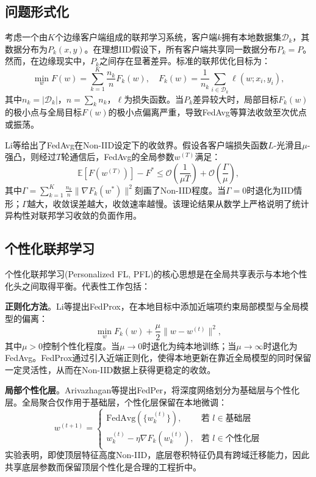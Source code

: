 \documentclass[a4paper,12pt]{article}
\begin{document}
\subsection{问题形式化}

考虑一个由$K$个边缘客户端组成的联邦学习系统，客户端$k$拥有本地数据集$\mathcal{D}_k$，其数据分布为$P_k(x,y)$。在理想IID假设下，所有客户端共享同一数据分布$P_k = P$。然而，在边缘现实中，$P_k$之间存在显著差异。标准的联邦优化目标为：
\begin{equation}
\min_{w} F(w) = \sum_{k=1}^{K} \frac{n_k}{n} F_k(w), \quad F_k(w) = \frac{1}{n_k}\sum_{i \in \mathcal{D}_k} \ell(w; x_i, y_i),
\label{eq:global_obj}
\end{equation}
其中$n_k = |\mathcal{D}_k|$，$n = \sum_k n_k$，$\ell$为损失函数。当$P_k$差异较大时，局部目标$F_k(w)$的极小点与全局目标$F(w)$的极小点偏离严重，导致FedAvg等算法收敛至次优点或振荡\cite{li2020convergence}。

Li等\cite{li2020convergence}给出了FedAvg在Non-IID设定下的收敛界。假设各客户端损失函数$L$-光滑且$\mu$-强凸，则经过$T$轮通信后，FedAvg的全局参数$w^{(T)}$满足：
\begin{equation}
\mathbb{E}[F(w^{(T)})] - F^* \leq \mathcal{O}\left(\frac{1}{\mu T}\right) + \mathcal{O}\left(\frac{\Gamma}{\mu}\right),
\end{equation}
其中$\Gamma = \sum_{k=1}^{K} \frac{n_k}{n}\|\nabla F_k(w^*)\|^2$刻画了Non-IID程度。当$\Gamma = 0$时退化为IID情形；$\Gamma$越大，收敛误差越大，收敛速率越慢。该理论结果从数学上严格说明了统计异构性对联邦学习收敛的负面作用。

\subsection{个性化联邦学习}

个性化联邦学习(Personalized FL, PFL)的核心思想是在全局共享表示与本地个性化头之间取得平衡。代表性工作包括：

\textbf{正则化方法}。Li等\cite{li2020federated}提出FedProx，在本地目标中添加近端项约束局部模型与全局模型的偏离：
\begin{equation}
\min_{w} F_k(w) + \frac{\mu}{2}\|w - w^{(t)}\|^2,
\label{eq:fedprox}
\end{equation}
其中$\mu > 0$控制个性化程度。当$\mu \to 0$时退化为纯本地训练；当$\mu \to \infty$时退化为FedAvg。FedProx通过引入近端正则化，使得本地更新在靠近全局模型的同时保留一定灵活性，从而在Non-IID数据上获得更稳定的收敛。

\textbf{局部个性化层}。Arivazhagan等\cite{arivazhagan2019federated}提出FedPer，将深度网络划分为基础层与个性化层。全局聚合仅作用于基础层，个性化层保留在本地微调：
\begin{equation}
w^{(t+1)} = \begin{cases}
\text{FedAvg}(\{w_k^{(t)}\}), & \text{若 } l \in \text{基础层} \\
w_k^{(t)} - \eta \nabla F_k(w_k^{(t)}), & \text{若 } l \in \text{个性化层}
\end{cases}
\end{equation}
实验表明，即使顶层特征高度Non-IID，底层卷积特征仍具有跨域迁移能力，因此共享底层参数而保留顶层个性化是合理的工程折中。
\end{document}
